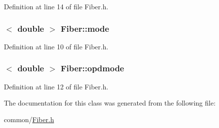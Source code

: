 Definition at line 14 of file Fiber.h.

\hypertarget{classFiber_a58eedc1ce162ecbe7c79dfd9dc929b47}{
\subsubsection[{mode}]{$<$ double $>$ {\bf Fiber::mode}}}
\label{classFiber_a58eedc1ce162ecbe7c79dfd9dc929b47}


Definition at line 10 of file Fiber.h.

\hypertarget{classFiber_a35e7392023f24af150bf5d0efdcf2573}{
\subsubsection[{opdmode}]{$<$ double $>$ {\bf Fiber::opdmode}}}
\label{classFiber_a35e7392023f24af150bf5d0efdcf2573}


Definition at line 12 of file Fiber.h.



The documentation for this class was generated from the following file:\begin{DoxyCompactItemize}
\item 
common/\hyperlink{Fiber_8h}{Fiber.h}\end{DoxyCompactItemize}
